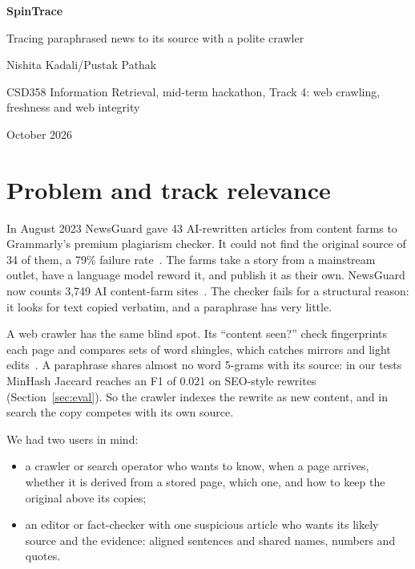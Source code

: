 \documentclass[11pt,a4paper]{article}
\begin{document}
{\headfont\bfseries\LARGE SpinTrace\par}
\vspace{0.25em}
{\headfont\large Tracing paraphrased news to its source with a polite crawler\par}
\vspace{0.7em}
{\headfontreg\small Nishita Kadali\quad\textcolor{warmgrey}{/}\quad Pustak Pathak\par
CSD358 Information Retrieval, mid-term hackathon, Track 4: web crawling, freshness and web integrity\par
October 2026\par}
\vspace{0.4em}

\section{Problem and track relevance}

In August 2023 NewsGuard gave 43 AI-rewritten articles from content farms to Grammarly's premium plagiarism checker. It could not find the original source of 34 of them, a 79\% failure rate~\cite{ng2023}. The farms take a story from a mainstream outlet, have a language model reword it, and publish it as their own. NewsGuard now counts 3,749 AI content-farm sites~\cite{ng2026}. The checker fails for a structural reason: it looks for text copied verbatim, and a paraphrase has very little.

A web crawler has the same blind spot. Its ``content seen?'' check fingerprints each page and compares sets of word shingles, which catches mirrors and light edits~\cite{broder1997,manku2007,iir2008}. A paraphrase shares almost no word 5-grams with its source: in our tests MinHash Jaccard reaches an F1 of 0.021 on SEO-style rewrites (Section~\ref{sec:eval}). So the crawler indexes the rewrite as new content, and in search the copy competes with its own source.

We had two users in mind:
\begin{itemize}
  \item a crawler or search operator who wants to know, when a page arrives, whether it is derived from a stored page, which one, and how to keep the original above its copies;
  \item an editor or fact-checker with one suspicious article who wants its likely source and the evidence: aligned sentences and shared names, numbers and quotes.
\end{itemize}
\end{document}
